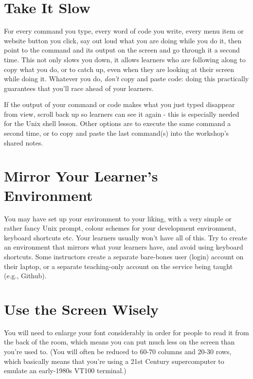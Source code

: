 \documentclass[10pt,statementpaper]{memoir}
\begin{document}
\section{Take It Slow}\label{take-it-slow}

For every command you type, every word of code you write, every menu
item or website button you click, say out loud what you are doing while
you do it, then point to the command and its output on the screen and go
through it a second time. This not only slows you down, it allows
learners who are following along to copy what you do, or to catch up,
even when they are looking at their screen while doing it. Whatever you
do, \emph{don't} copy and paste code: doing this practically guarantees
that you'll race ahead of your learners.

If the output of your command or code makes what you just typed
disappear from view, scroll back up so learners can see it again - this
is especially needed for the Unix shell lesson. Other options are to
execute the same command a second time, or to copy and paste the last
command(s) into the workshop's shared notes.

\section{Mirror Your Learner's
Environment}\label{mirror-your-learners-environment}

You may have set up your environment to your liking, with a very simple
or rather fancy Unix prompt, colour schemes for your development
environment, keyboard shortcuts etc. Your learners usually won't have
all of this. Try to create an environment that mirrors what your
learners have, and avoid using keyboard shortcuts. Some instructors
create a separate bare-bones user (login) account on their laptop, or a
separate teaching-only account on the service being taught (e.g.,
Github).

\section{Use the Screen Wisely}\label{use-the-screen-wisely}

You will need to enlarge your font considerably in order for people to
read it from the back of the room, which means you can put much less on
the screen than you're used to. (You will often be reduced to 60-70
columns and 20-30 rows, which basically means that you're using a 21st
Century supercomputer to emulate an early-1980s VT100 terminal.)
\end{document}
